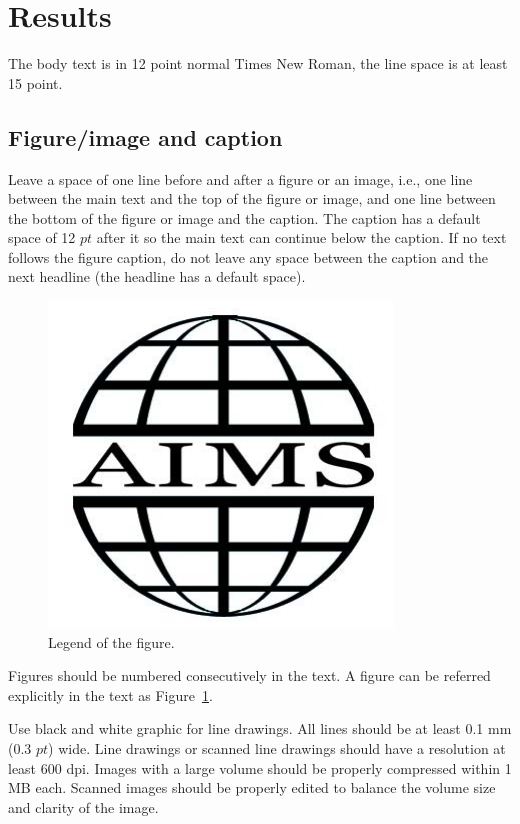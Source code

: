 \documentclass{aims}
\numberwithin{equation}{section}
\theoremstyle{definition}
\begin{document}

\section{Results}
The body text is in 12 point normal Times New Roman, 
the line space is at least 15 point.
 


\subsection{Figure/image and caption}
 Leave a space of one line before and after a figure or an image, i.e., one line between the main text and the top of the figure or image, and one line between the bottom of the figure or image and the caption. The caption has a default space of 12 $pt$ after it so the main text can continue below the caption. If no text follows the figure caption, do not leave any space between the caption and the next headline (the headline has a default space). 
 
\begin{figure}[H]
\begin{center}
\includegraphics[scale=0.8]{figure.pdf}
\caption{Legend of the figure.}
\label{Fig1}
\end{center}
\end{figure}

 
 Figures should be numbered consecutively in the text. A figure can be referred explicitly in the text as Figure~\ref{Fig1}.
 
 Use black and white graphic for line drawings. All lines should be at least 0.1 mm (0.3 $pt$) wide. Line drawings or scanned line drawings should have a resolution at least 600 dpi. Images with a large volume should be properly compressed within 1 MB each. Scanned images should be properly edited to balance the volume size and clarity of the image. 
 
\end{document}
